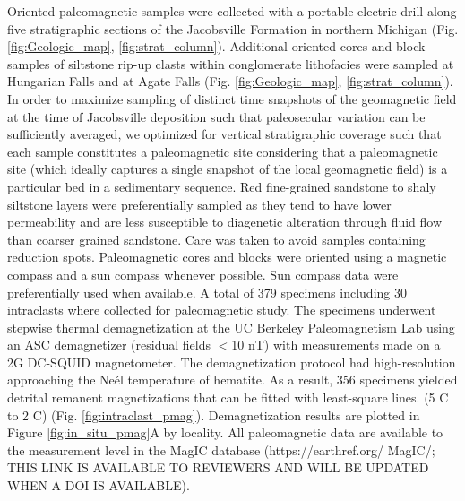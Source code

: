 \documentclass[draft]{agujournal2019}
\begin{document}
Oriented paleomagnetic samples were collected with a portable electric drill along five stratigraphic sections of the Jacobsville Formation in northern Michigan (Fig. \ref{fig:Geologic_map}, \ref{fig:strat_column}). Additional oriented cores and block samples of siltstone rip-up clasts within conglomerate lithofacies were sampled at Hungarian Falls and at Agate Falls (Fig. \ref{fig:Geologic_map}, \ref{fig:strat_column}). In order to maximize sampling of distinct time snapshots of the geomagnetic field at the time of Jacobsville deposition such that paleosecular variation can be sufficiently averaged, we optimized for vertical stratigraphic coverage such that each sample constitutes a paleomagnetic site considering that a paleomagnetic site (which ideally captures a single snapshot of the local geomagnetic field) is a particular bed in a sedimentary sequence. Red fine-grained sandstone to shaly siltstone layers were preferentially sampled as they tend to have lower permeability and are less susceptible to diagenetic alteration through fluid flow than coarser grained sandstone. Care was taken to avoid samples containing reduction spots. Paleomagnetic cores and blocks were oriented using a magnetic compass and a sun compass whenever possible. Sun compass data were preferentially used when available. A total of 379 specimens including 30 intraclasts where collected for paleomagnetic study. The specimens underwent stepwise thermal demagnetization at the UC Berkeley Paleomagnetism Lab using an ASC demagnetizer (residual fields $<$10 nT) with measurements made on a 2G DC-SQUID magnetometer. The demagnetization protocol had high-resolution approaching the Ne\'el temperature of hematite. As a result, 356 specimens yielded detrital remanent magnetizations that can be fitted with least-square lines. (5 \textdegree C to 2 \textdegree C) (Fig. \ref{fig:intraclast_pmag}). Demagnetization results are plotted in Figure \ref{fig:in_situ_pmag}A by locality. All paleomagnetic data are available to the measurement level in the MagIC database (https://earthref.org/ MagIC/; THIS LINK IS AVAILABLE TO REVIEWERS AND WILL BE UPDATED WHEN A DOI IS AVAILABLE).
\end{document}
